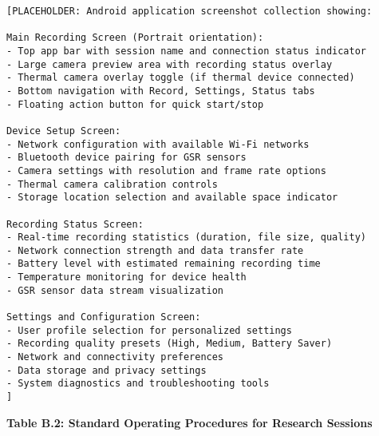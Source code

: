 \documentclass[11pt,a4paper]{article}
\begin{document}
\begin{verbatim}
[PLACEHOLDER: Android application screenshot collection showing:

Main Recording Screen (Portrait orientation):
- Top app bar with session name and connection status indicator
- Large camera preview area with recording status overlay
- Thermal camera overlay toggle (if thermal device connected)
- Bottom navigation with Record, Settings, Status tabs
- Floating action button for quick start/stop

Device Setup Screen:
- Network configuration with available Wi-Fi networks
- Bluetooth device pairing for GSR sensors
- Camera settings with resolution and frame rate options
- Thermal camera calibration controls
- Storage location selection and available space indicator

Recording Status Screen:
- Real-time recording statistics (duration, file size, quality)
- Network connection strength and data transfer rate
- Battery level with estimated remaining recording time
- Temperature monitoring for device health
- GSR sensor data stream visualization

Settings and Configuration Screen:
- User profile selection for personalized settings
- Recording quality presets (High, Medium, Battery Saver)
- Network and connectivity preferences
- Data storage and privacy settings
- System diagnostics and troubleshooting tools
]
\end{verbatim}

\textbf{Table B.2: Standard Operating Procedures for Research Sessions}
\end{document}
